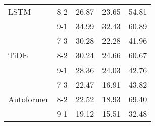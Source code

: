 \begin{table}[h!]
\begin{tabular}{|l|c|c|c|c|}
    \rowcolor{white} LSTM & 8-2 & 26.87 & 23.65 & 54.81 \\ 
    \rowcolor{white}  & 9-1 & 34.99 & 32.43 & 60.89 \\ \hline
    \rowcolor{white!30} & 7-3 & 30.28 & 22.28 & 41.96 \\ 
    \rowcolor{white!30} TiDE & 8-2 & 30.24 & 24.66 & 60.67 \\ 
    \rowcolor{white!30} & 9-1 & 28.36 & 24.03 & 42.76 \\ \hline
    \rowcolor{white}  & 7-3 & 22.47 & 16.91 & 43.82 \\ 
    \rowcolor{white} Autoformer & 8-2 & 22.52 & 18.93 & 69.40 \\ 
    \rowcolor{white}  & 9-1 & 19.12 & 15.51 & 32.48 \\ \hline

    \end{tabular}
\end{table}